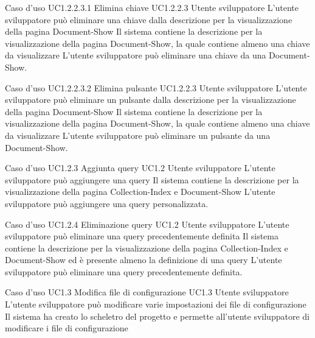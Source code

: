 \UCtitle
{Caso d'uso UC1.2.2.3.1}
{Elimina chiave}
\UC
{UC1.2.2.3}
{Utente sviluppatore}
{L'utente sviluppatore  può eliminare una chiave  dalla descrizione per la visualizzazione della pagina Document-Show}
{Il sistema contiene la descrizione per la visualizzazione della pagina Document-Show, la quale contiene almeno una chiave da visualizzare}
\scenario
{L'utente sviluppatore può eliminare una chiave da una Document-Show.}

\UCtitle
{Caso d'uso UC1.2.2.3.2}
{Elimina pulsante}
\UC
{UC1.2.2.3}
{Utente sviluppatore}
{L'utente sviluppatore può eliminare un pulsante dalla descrizione per la visualizzazione della pagina Document-Show}
{Il sistema contiene la descrizione per la visualizzazione della pagina Document-Show, la quale contiene almeno una chiave da visualizzare}
\scenario
{L'utente sviluppatore può eliminare un pulsante da una Document-Show.}

\UCtitle
{Caso d'uso UC1.2.3}
{Aggiunta query}
\UC
{UC1.2}
{Utente sviluppatore}
{L'utente sviluppatore può aggiungere una query}
{Il sistema contiene la descrizione per la visualizzazione della pagina Collection-Index e Document-Show}
\scenario
{L'utente sviluppatore può aggiungere una query personalizzata.}

\UCtitle
{Caso d'uso UC1.2.4}
{Eliminazione query}
\UC
{UC1.2}
{Utente sviluppatore}
{L'utente sviluppatore può eliminare una query precedentemente definita}
{Il sistema contiene la descrizione per la visualizzazione della pagina Collection-Index e Document-Show ed è presente almeno la definizione di una query}
\scenario
{L'utente sviluppatore può eliminare una query precedentemente definita.}

\UCtitle
{Caso d'uso UC1.3}
{Modifica file di configurazione}
\UC
{UC1.3}
{Utente sviluppatore}
{L'utente sviluppatore  può modificare varie impostazioni dei file di configurazione}
{Il sistema ha creato lo scheletro del progetto e permette all'utente sviluppatore di modificare i file di configurazione}

